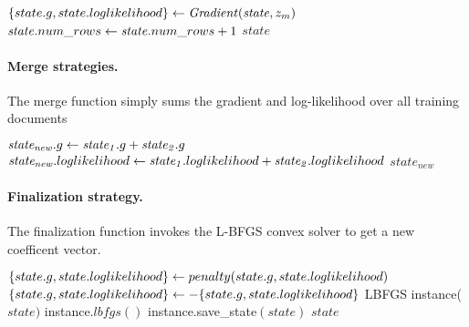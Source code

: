 \begin{algorithm} \label{alg:transition-lbfgs}
\begin{algorithmic}[1]
    \State $\{state.g,state.loglikelihood\}  \leftarrow \mathit{Gradient}(\mathit{state}, z_m)$
    \State $\mathit{state}.num\_rows \leftarrow \mathit{state}.num\_rows + 1$
    \State \Return $\mathit{state}$
\end{algorithmic}
\end{algorithm}


\paragraph{Merge strategies.}
The merge function simply sums the gradient and log-likelihood over all training documents
\begin{algorithm} \label{alg:merge-lbfgs}
\begin{algorithmic}[1]
    \State $\mathit{state_{new}}.g \leftarrow \mathit{state_1}.g + \mathit{state_2}.g$
    \State $\mathit{state_{new}}.loglikelihood \leftarrow \mathit{state_1}.loglikelihood + \mathit{state_2}.loglikelihood$
    \State \Return $\mathit{state_{new}}$
\end{algorithmic}
\end{algorithm}


\paragraph{Finalization strategy.}
The finalization function invokes the L-BFGS convex solver to get a new coefficent vector.\\

\begin{algorithm} \label{alg:CRF training}
\begin{algorithmic}[1]
        \State $\{state.g,state.loglikelihood\} \leftarrow penalty(state.g,state.loglikelihood)$ 
        \State $\{state.g,state.loglikelihood\}\leftarrow-\{state.g,state.loglikelihood\}$ 
        \State LBFGS instance($state)$ 
        \State instance.$lbfgs()$ 
        \State instance.save\_state$(state)$ 
        \State \Return $state$
\end{algorithmic}
\end{algorithm}

